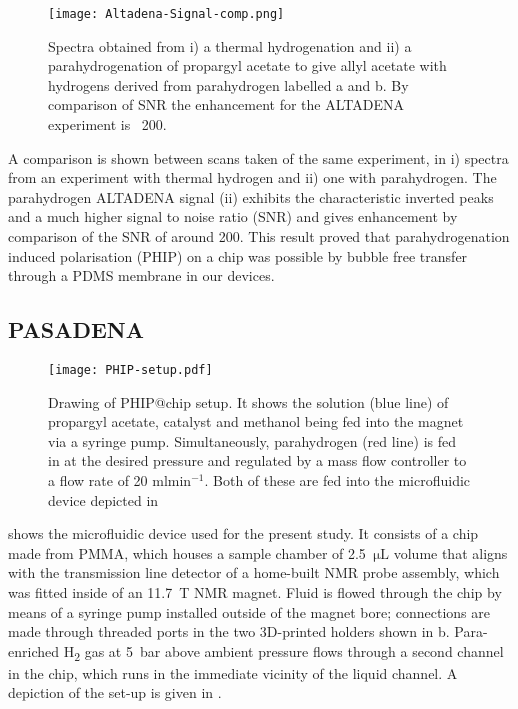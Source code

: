\begin{figure}
  \begin{center}
  \texttt{[image: Altadena-Signal-comp.png]}
  \end{center}
  \caption{Spectra obtained from i) a thermal hydrogenation and ii) a parahydrogenation
  of propargyl acetate to give allyl acetate with hydrogens derived from parahydrogen labelled a and
  b. By comparison of SNR the enhancement for the ALTADENA experiment is ~200. }
  \label{fig:AltadenaResults}
\end{figure}

A comparison is shown between scans taken of the same experiment, in  i) spectra
from an experiment with thermal hydrogen and ii) one with parahydrogen. The parahydrogen
ALTADENA signal (ii) exhibits the characteristic inverted peaks and a much higher signal
to noise ratio (SNR) and gives enhancement by comparison of the SNR of around 200.
This result proved that parahydrogenation induced polarisation (PHIP) on a chip
was possible by bubble free transfer through a PDMS membrane in our devices.

\subsection{PASADENA}

\begin{figure}
  \begin{center}
  \texttt{[image: PHIP-setup.pdf]}
  \end{center}
  \caption{Drawing of PHIP@chip setup. It shows the solution (blue line)
  of propargyl acetate, catalyst and methanol being fed into the magnet
  via a syringe pump. Simultaneously, parahydrogen (red line) is fed in
  at the desired pressure and regulated by a mass flow controller to a
  flow rate of 20 ml$\text{min}^{-1}$. Both of these are fed into the
  microfluidic device depicted in }
  \label{fig:SetUp}
\end{figure}

 shows the microfluidic device used for the
present study. It consists of a chip made from PMMA, which houses a sample
chamber of 2.5~$\mathrm{\mu L}$ volume that aligns with the transmission line
detector of a home-built NMR probe assembly, which was fitted inside of an
11.7~T NMR magnet.
Fluid is flowed through the chip by means of a syringe pump
installed outside of the magnet bore; connections are made through threaded
ports in the two 3D-printed holders shown in b.
Para-enriched H\textsubscript{2} gas at 5~bar above ambient pressure flows
through a second
channel in the chip, which runs in
the immediate vicinity of the liquid channel. A depiction of the set-up is given in .


